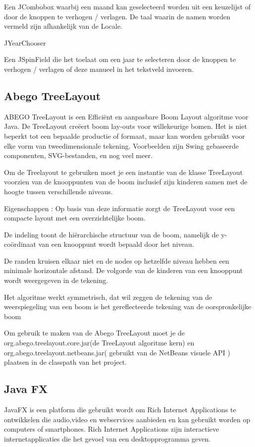 \documentclass[pdftex,a4paper,12pt,twoside]{report}
\begin{document}
Een JCombobox  waarbij een maand kan geselecteerd worden uit een keuzelijst of door de knoppen te verhogen / verlagen. De taal waarin de namen worden vermeld zijn afhankelijk van de Locale.
 
JYearChooser

Een JSpinField die het toelaat om een jaar te selecteren door de knoppen te verhogen / verlagen of deze manueel in het tekstveld invoeren.




\subsection{Abego TreeLayout}
ABEGO TreeLayout is een Efficiënt en aanpasbare Boom Layout algoritme voor Java.
De TreeLayout creëert boom lay-outs voor willekeurige bomen. Het is niet beperkt tot een bepaalde productie of formaat, maar kan worden gebruikt voor elke vorm van tweedimensionale tekening. Voorbeelden zijn Swing gebaseerde componenten, SVG-bestanden, en nog veel meer.

Om de Treelayout te gebruiken moet je een instantie van de klasse TreeLayout voorzien van de knooppunten van de boom inclusief zijn kinderen samen met de hoogte tussen verschillende niveaus.

Eigenschappen :
Op basis van deze informatie zorgt de TreeLayout voor een compacte layout met een overzichtelijke boom.

De indeling toont de hiërarchische structuur van de boom, namelijk de y-coördinaat van een knooppunt wordt bepaald door het niveau.

De randen kruisen elkaar niet en de nodes op hetzelfde niveau hebben een minimale horizontale afstand.
De volgorde van de kinderen van een knooppunt wordt weergegeven in de tekening.

Het algoritme werkt symmetrisch, dat wil zeggen de tekening van de weerspiegeling van een boom is het gereflecteerde tekening van de oorspronkelijke boom


Om gebruik te maken van de Abego TreeLayout moet je de org.abego.treelayout.core.jar(de TreeLayout algoritme kern) en org.abego.treelayout.netbeans.jar( gebruikt  van de NetBeans visuele API ) plaatsen in de classpath van het project.


\subsection{Java FX}
JavaFX is een platform die gebruikt wordt om Rich Internet Applications te ontwikkelen die audio,video en webservices aanbieden en kan gebruikt worden op computers of smartphones.
Rich Internet Applications zijn interactieve internetapplicaties die het gevoel van een desktopprogramma geven.
\end{document}
